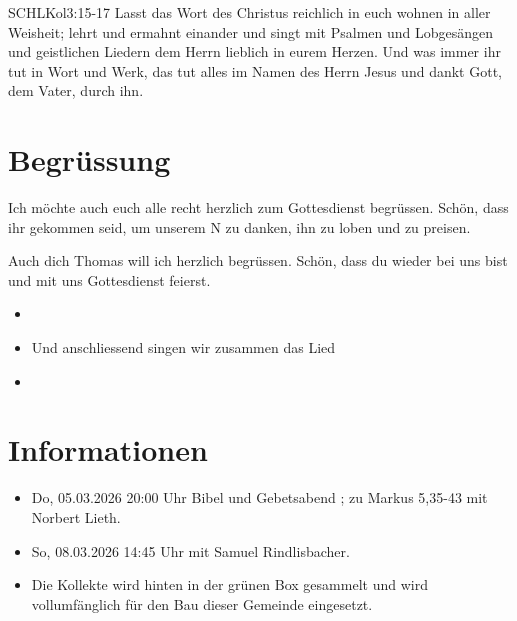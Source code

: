\documentclass[14pt]{../../inc/mybib}
\newcommand{\Name}{Thomas}
\begin{document}
\begin{bibelbox}{SCHL}{Kol}{3:15-17}
    Lasst das Wort des Christus reichlich in euch wohnen in aller Weisheit; lehrt und ermahnt einander und singt mit Psalmen und Lobgesängen und geistlichen Liedern dem Herrn lieblich in eurem Herzen. Und was immer ihr tut in Wort und Werk, das tut alles im Namen des Herrn Jesus und dankt Gott, dem Vater, durch ihn.
\end{bibelbox}
\section{Begrüssung}
Ich möchte auch euch alle recht herzlich zum Gottesdienst begrüssen. Schön, dass ihr gekommen seid, um unserem \herr N zu danken, ihn zu loben und zu preisen.


Auch dich \Name{} will ich herzlich begrüssen. Schön, dass du wieder bei uns bist und mit uns Gottesdienst feierst.
\begin{itemize}
    \item[] \beten{}
    \item[] Und anschliessend singen wir zusammen das Lied
    \item[] 
\end{itemize}

\section{Informationen}
\begin{itemize}
    \item {} Do, 05.03.2026 20:00 Uhr Bibel und Gebetsabend ; zu Markus 5,35-43 mit Norbert Lieth.
    \item {} So, 08.03.2026 14:45 Uhr mit Samuel Rindlisbacher.
    \item {} Die Kollekte wird hinten in der grünen Box gesammelt und wird vollumfänglich für den Bau dieser Gemeinde eingesetzt.
\end{itemize}
\end{document}
